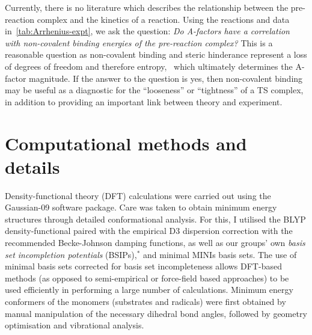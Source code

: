 Currently, there is no literature which describes the relationship between the pre-reaction complex and the kinetics of a reaction. Using the reactions and data in~\ref{tab:Arrhenius-expt}, we ask the question: \emph{Do A-factors have a correlation with non-covalent binding energies of the pre-reaction complex?} This is a reasonable question as non-covalent binding and steric hinderance represent a loss of degrees of freedom and therefore entropy,\footnotemark~ which ultimately determines the A-factor magnitude. If the answer to the question is yes, then non-covalent binding may be useful as a diagnostic for the ``looseness'' or ``tightness'' of a TS complex, in addition to providing an important link between theory and experiment.


\section{Computational methods and details}

Density-functional theory (DFT) calculations were carried out using the Gaussian-09 software package.\cite{Frisch2009} Care was taken to obtain minimum energy structures through detailed conformational analysis. For this, I utilised the BLYP density-functional\cite{Becke1988,Lee1988} paired with the empirical D3 dispersion correction\cite{Grimme2010} with the recommended Becke-Johnson damping functions,\cite{Johnson2006} as well as our groups' own \emph{basis set incompletion potentials} (BSIPs),$^*$ and minimal MINIs basis sets.\cite{Huzinaga1984} The use of minimal basis sets corrected for basis set incompleteness allows DFT-based methods (as opposed to semi-empirical or force-field based approaches) to be used efficiently in performing a large number of calculations. Minimum energy conformers of the monomers (substrates and radicals) were first obtained by manual manipulation of the necessary dihedral bond angles, followed by geometry optimisation and vibrational analysis.

